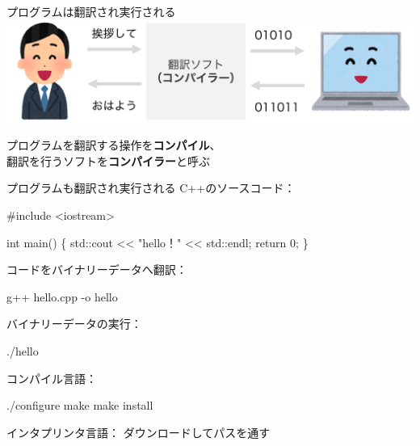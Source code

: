 \documentclass[
  ignorenonframetext,
]{beamer}
\newenvironment{Shaded}{\begin{snugshade}}{\end{snugshade}}
\newcommand{\AttributeTok}[1]{\textcolor[rgb]{0.40,0.45,0.13}{#1}}
\newcommand{\ExtensionTok}[1]{\textcolor[rgb]{0.00,0.23,0.31}{#1}}
\newcommand{\FunctionTok}[1]{\textcolor[rgb]{0.28,0.35,0.67}{#1}}
\newcommand{\NormalTok}[1]{\textcolor[rgb]{0.00,0.23,0.31}{#1}}
\begin{document}
\begin{frame}{プログラムは翻訳され実行される}
\protect\hypertarget{ux30d7ux30edux30b0ux30e9ux30e0ux306fux7ffbux8a33ux3055ux308cux5b9fux884cux3055ux308cux308b}{}
\includegraphics[width=8.33333in,height=\textheight]{image/intractive.png}

プログラムを翻訳する操作を\textbf{コンパイル}、\\
翻訳を行うソフトを\textbf{コンパイラー}と呼ぶ
\end{frame}

\begin{frame}[fragile]{プログラムも翻訳され実行される}
\protect\hypertarget{ux30d7ux30edux30b0ux30e9ux30e0ux3082ux7ffbux8a33ux3055ux308cux5b9fux884cux3055ux308cux308b}{}
C++のソースコード：

\begin{Shaded}
\begin{Highlighting}[]
\NormalTok{\#include \textless{}iostream\textgreater{}}

\NormalTok{int main() \{}
\NormalTok{    std::cout \textless{}\textless{} "hello！" \textless{}\textless{} std::endl;}
\NormalTok{    return 0;}
\NormalTok{\}}
\end{Highlighting}
\end{Shaded}

コードをバイナリーデータへ翻訳：

\begin{Shaded}
\begin{Highlighting}[]
\ExtensionTok{g++}\NormalTok{ hello.cpp }\AttributeTok{{-}o}\NormalTok{ hello}
\end{Highlighting}
\end{Shaded}

バイナリーデータの実行：

\begin{Shaded}
\begin{Highlighting}[]
\ExtensionTok{./hello}
\end{Highlighting}
\end{Shaded}

コンパイル言語：

\begin{Shaded}
\begin{Highlighting}[]
\ExtensionTok{./configure}
\FunctionTok{make}
\FunctionTok{make}\NormalTok{ install}
\end{Highlighting}
\end{Shaded}

インタプリンタ言語： ダウンロードしてパスを通す
\end{frame}
\end{document}
